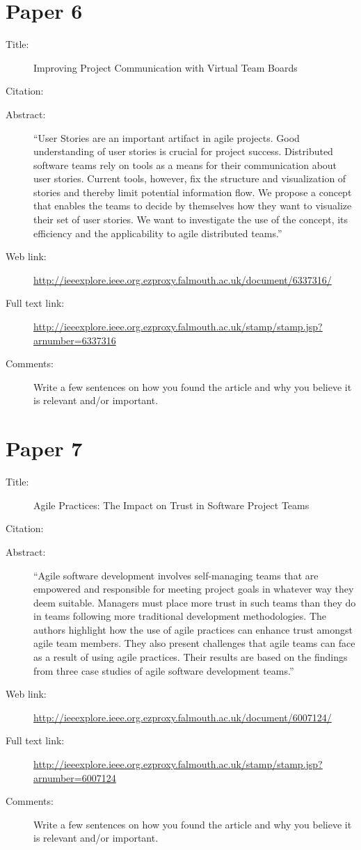 \documentclass{scrartcl}
\begin{document}
\section*{Paper 6}
\begin{description}
\item[Title:] Improving Project Communication with Virtual Team Boards
\item[Citation:] \cite{bibtex_key}
\item[Abstract:] ``User Stories are an important artifact in agile projects. Good understanding of user stories is crucial for project success. Distributed software teams rely on tools as a means for their communication about user stories. Current tools, however, fix the structure and visualization of stories and thereby limit potential information flow. We propose a concept that enables the teams to decide by themselves how they want to visualize their set of user stories. We want to investigate the use of the concept, its efficiency and the applicability to agile distributed teams.''
\item[Web link:] \url{http://ieeexplore.ieee.org.ezproxy.falmouth.ac.uk/document/6337316/}
\item[Full text link:] \url{http://ieeexplore.ieee.org.ezproxy.falmouth.ac.uk/stamp/stamp.jsp?arnumber=6337316}
\item[Comments:] Write a few sentences on how you found the article and why you believe it is relevant and/or important.
\end{description}

\section*{Paper 7}
\begin{description}
\item[Title:] Agile Practices: The Impact on Trust in Software Project Teams
\item[Citation:] \cite{bibtex_key}
\item[Abstract:] ``Agile software development involves self-managing teams that are empowered and responsible for meeting project goals in whatever way they deem suitable. Managers must place more trust in such teams than they do in teams following more traditional development methodologies. The authors highlight how the use of agile practices can enhance trust amongst agile team members. They also present challenges that agile teams can face as a result of using agile practices. Their results are based on the findings from three case studies of agile software development teams.''
\item[Web link:] \url{http://ieeexplore.ieee.org.ezproxy.falmouth.ac.uk/document/6007124/}
\item[Full text link:] \url{http://ieeexplore.ieee.org.ezproxy.falmouth.ac.uk/stamp/stamp.jsp?arnumber=6007124}
\item[Comments:] Write a few sentences on how you found the article and why you believe it is relevant and/or important.
\end{description}




\end{document}
